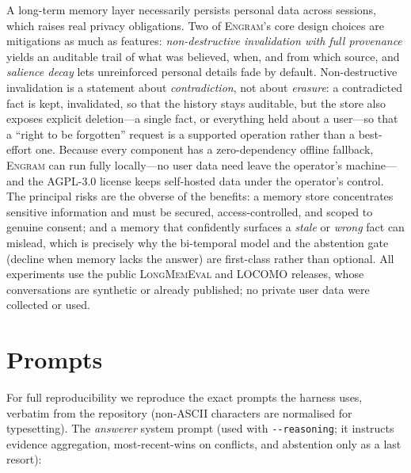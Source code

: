 \documentclass{article}
\newcommand{\engram}{\textsc{Engram}}
\begin{document}
A long-term memory layer necessarily persists personal data across sessions, which raises real privacy
obligations. Two of \engram{}'s core design choices are mitigations as much as features: \emph{non-destructive
invalidation with full provenance} yields an auditable trail of what was believed, when, and from which
source, and \emph{salience decay} lets unreinforced personal details fade by default. Non-destructive
invalidation is a statement about \emph{contradiction}, not about \emph{erasure}: a contradicted fact is
kept, invalidated, so that the history stays auditable, but the store also exposes explicit deletion---a
single fact, or everything held about a user---so that a ``right to be forgotten'' request is a supported
operation rather than a best-effort one. Because every component has a zero-dependency offline fallback,
\engram{} can run fully locally---no user data need leave the operator's machine---and the AGPL-3.0 license
keeps self-hosted data under the operator's control. The principal risks are the obverse of the benefits: a
memory store concentrates sensitive information and must be secured, access-controlled, and scoped to genuine
consent; and a memory that confidently surfaces a \emph{stale} or \emph{wrong} fact can mislead, which is
precisely why the bi-temporal model and the abstention gate (decline when memory lacks the answer) are
first-class rather than optional. All experiments use the public \textsc{LongMemEval} and LOCOMO releases,
whose conversations are synthetic or already published; no private user data were collected or used.




\appendix
\label{app:start}

\section{Prompts}
\label{app:prompts}

For full reproducibility we reproduce the exact prompts the harness uses, verbatim from the repository
(non-ASCII characters are normalised for typesetting). The \emph{answerer} system prompt (used with
\texttt{-{}-reasoning}; it instructs evidence aggregation, most-recent-wins on conflicts, and abstention
only as a last resort):
\end{document}
